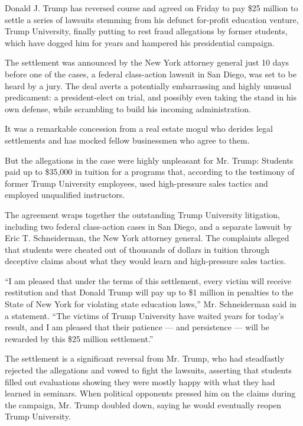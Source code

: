 Donald J. Trump has reversed course and agreed on Friday to pay \$25
million to settle a series of lawsuits stemming from his defunct
for-profit education venture, Trump University, finally putting to rest
fraud allegations by former students, which have dogged him for years
and hampered his presidential campaign.

The settlement was announced by the New York attorney general just 10
days before one of the cases, a federal class-action lawsuit in San
Diego, was set to be heard by a jury. The deal averts a potentially
embarrassing and highly unusual predicament: a president-elect on trial,
and possibly even taking the stand in his own defense, while scrambling
to build his incoming administration.

It was a remarkable concession from a real estate mogul who derides
legal settlements and has mocked fellow businessmen who agree to them.

But the allegations in the case were highly unpleasant for Mr. Trump:
Students paid up to \$35,000 in tuition for a programs that, according
to the testimony of former Trump University employees, used
high-pressure sales tactics and employed unqualified instructors.

The agreement wraps together the outstanding Trump University
litigation, including two federal class-action cases in San Diego, and a
separate lawsuit by Eric T. Schneiderman, the New York attorney general.
The complaints alleged that students were cheated out of thousands of
dollars in tuition through deceptive claims about what they would learn
and high-pressure sales tactics.

``I am pleased that under the terms of this settlement, every victim
will receive restitution and that Donald Trump will pay up to \$1
million in penalties to the State of New York for violating state
education laws,'' Mr. Schneiderman said in a statement. ``The victims of
Trump University have waited years for today's result, and I am pleased
that their patience --- and persistence --- will be rewarded by this
\$25 million settlement.''

The settlement is a significant reversal from Mr. Trump, who had
steadfastly rejected the allegations and vowed to fight the lawsuits,
asserting that students filled out evaluations showing they were mostly
happy with what they had learned in seminars. When political opponents
pressed him on the claims during the campaign, Mr. Trump doubled down,
saying he would eventually reopen Trump University.


